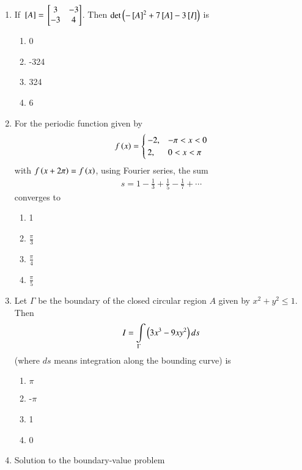 \documentclass[journal]{IEEEtran}
\begin{document}
\begin{enumerate}
\item If ${}\left[A\right] = {}\left[\begin{matrix}
    3 & -3 \\ -3 & 4
\end{matrix}\right]$. Then $\det\left(-{}\left[A\right]^2 + 7{}\left[A\right] - 3{}\left[I\right]\right)$ is
\begin{enumerate}
    \item 0
    \item -324
    \item 324 
    \item 6 \\
\end{enumerate}
\item For the periodic function given by
\begin{align*}
    f\left(x\right) = \begin{cases}
        -2, & -\pi < x < 0 \\
        2, & 0 < x < \pi
    \end{cases}
\end{align*}
with $f\left(x+2\pi\right) = f\left(x\right)$, using Fourier series, the sum
\begin{align*}
    s = 1 - \frac{1}{3} + \frac{1}{5} - \frac{1}{7} + \cdots
\end{align*}
converges to
\begin{enumerate}
    \item 1
    \item $\frac{\pi}{3}$
    \item $\frac{\pi}{4}$
    \item $\frac{\pi}{5}$ \\
\end{enumerate}
\item Let $\Gamma$ be the boundary of the closed circular region $A$ given by $x^2 + y^2 \leq 1$. Then 
\begin{align*}
    I = \int\limits_{\Gamma}\left(3x^3 - 9xy^2\right)ds
\end{align*}
(where $ds$ means integration along the bounding curve) is 
  \begin{enumerate}
   \item $\pi$
   \item -$\pi$
   \item 1
   \item 0 \\
\end{enumerate}
\item Solution to the boundary-value problem
\begin{align*}

\end{align*}
\end{enumerate}
\end{document}
